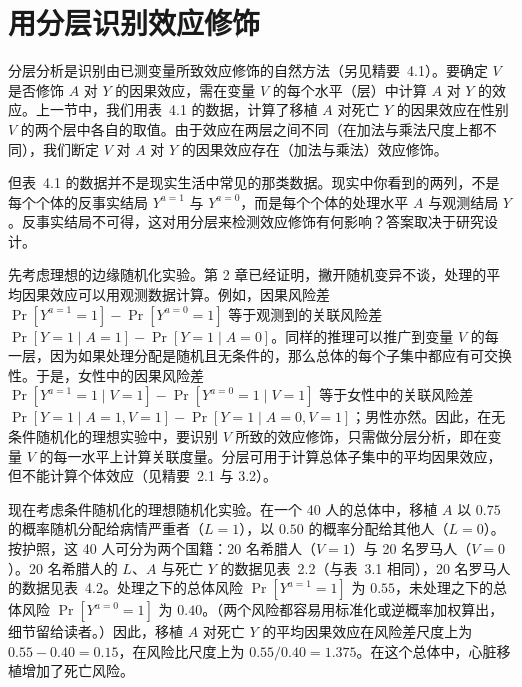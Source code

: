 \section{用分层识别效应修饰}

分层分析是识别由已测变量所致效应修饰的自然方法（另见精要~4.1）。要确定 $V$ 是否修饰 $A$ 对 $Y$ 的因果效应，需在变量 $V$ 的每个水平（层）中计算 $A$ 对 $Y$ 的效应。上一节中，我们用表~4.1 的数据，计算了移植 $A$ 对死亡 $Y$ 的因果效应在性别 $V$ 的两个层中各自的取值。由于效应在两层之间不同（在加法与乘法尺度上都不同），我们断定 $V$ 对 $A$ 对 $Y$ 的因果效应存在（加法与乘法）效应修饰。

但表~4.1 的数据并不是现实生活中常见的那类数据。现实中你看到的两列，不是每个个体的反事实结局 $Y^{a=1}$ 与 $Y^{a=0}$，而是每个个体的处理水平 $A$ 与观测结局 $Y$。反事实结局不可得，这对用分层来检测效应修饰有何影响？答案取决于研究设计。

先考虑理想的边缘随机化实验。第 2 章已经证明，撇开随机变异不谈，处理的平均因果效应可以用观测数据计算。例如，因果风险差 $\Pr[Y^{a=1}=1]-\Pr[Y^{a=0}=1]$ 等于观测到的关联风险差 $\Pr[Y=1\mid A=1]-\Pr[Y=1\mid A=0]$。同样的推理可以推广到变量 $V$ 的每一层，因为如果处理分配是随机且无条件的，那么总体的每个子集中都应有可交换性。于是，女性中的因果风险差 $\Pr[Y^{a=1}=1\mid V=1]-\Pr[Y^{a=0}=1\mid V=1]$ 等于女性中的关联风险差 $\Pr[Y=1\mid A=1,V=1]-\Pr[Y=1\mid A=0,V=1]$；男性亦然。因此，在无条件随机化的理想实验中，要识别 $V$ 所致的效应修饰，只需做分层分析，即在变量 $V$ 的每一水平上计算关联度量。分层可用于计算总体子集中的平均因果效应，但不能计算个体效应（见精要~2.1 与 3.2）。

现在考虑条件随机化的理想随机化实验。在一个 40 人的总体中，移植 $A$ 以 $0.75$ 的概率随机分配给病情严重者（$L=1$），以 $0.50$ 的概率分配给其他人（$L=0$）。按护照，这 40 人可分为两个国籍：20 名希腊人（$V=1$）与 20 名罗马人（$V=0$）。20 名希腊人的 $L$、$A$ 与死亡 $Y$ 的数据见表~2.2（与表~3.1 相同），20 名罗马人的数据见表~4.2。处理之下的总体风险 $\Pr[Y^{a=1}=1]$ 为 $0.55$，未处理之下的总体风险 $\Pr[Y^{a=0}=1]$ 为 $0.40$。（两个风险都容易用标准化或逆概率加权算出，细节留给读者。）因此，移植 $A$ 对死亡 $Y$ 的平均因果效应在风险差尺度上为 $0.55-0.40=0.15$，在风险比尺度上为 $0.55/0.40=1.375$。在这个总体中，心脏移植增加了死亡风险。

